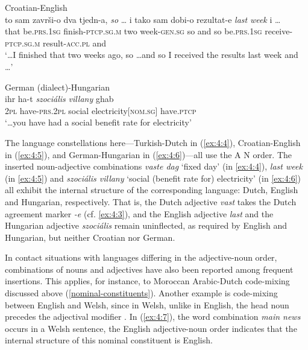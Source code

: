 \ea{\label{ex:4:5}}
Croatian-English \citep[231]{hlavac-second-generation-2003}\\
\gll {\dots} to sam završi-o dva tjedn-a, \textit{so} {\dots} i tako sam dobi-o rezultat-e \textit{last} \textit{week} i {\dots}\\
	{} that be.\textsc{prs.1sg} finish-\textsc{ptcp.sg.m} two week-\textsc{gen.sg} so {} and so be.\textsc{prs.1sg} receive-\textsc{ptcp.sg.m}  result-\textsc{acc.pl} {} {} and {}\\
\glt `\dots I finished that two weeks ago, so \dots and so I received the results last week and \dots'
\z

\ea{\label{ex:4:6}}
German (dialect)-Hungarian \citep[373]{szabo-language-2010}\\
\gll {\dots} ihr ha-t \textit{szociális} \textit{villany} ghab\\
	{} \textsc{2pl} have-\textsc{prs.2pl} social electricity[\textsc{nom.sg}] have.\textsc{ptcp}\\
\glt `\dots you have had a social benefit rate for electricity'
\z

\noindent The language constellations here---Turkish-Dutch in (\ref{ex:4:4}), Croatian-English in (\ref{ex:4:5}), and German-Hungarian in (\ref{ex:4:6})---all use the A N order. The inserted noun-adjective combinations \textit{vaste dag} `fixed day' (in \ref{ex:4:4}), \textit{last week} (in \ref{ex:4:5}) and \textit{szociális villany} `social (benefit rate for) electricity' (in \ref{ex:4:6}) all exhibit the internal structure of the corresponding language: Dutch, English and Hungarian, respectively. That is, the Dutch adjective \textit{vast} takes the Dutch agreement marker \textit{-e} (cf. \ref{ex:4:3}), and the English adjective \textit{last} and the Hungarian adjective \textit{szociális} remain uninflected, as required by English and Hungarian, but neither Croatian nor German.

In contact situations with languages differing in the adjective-noun order, combinations of nouns and adjectives have also been reported among frequent insertions. This applies, for instance, to Moroccan Arabic-Dutch code-mixing discussed above (\ref{nominal-constituents}). Another example is code-mixing between English and Welsh, since in Welsh, unlike in English, the head noun precedes the adjectival modifier \citep[cf.][260]{deuchar-congruence-2005}. In (\ref{ex:4:7}), the word combination \textit{main news} occurs in a Welsh sentence, the English adjective-noun order indicates that the internal structure of this nominal constituent is English.


